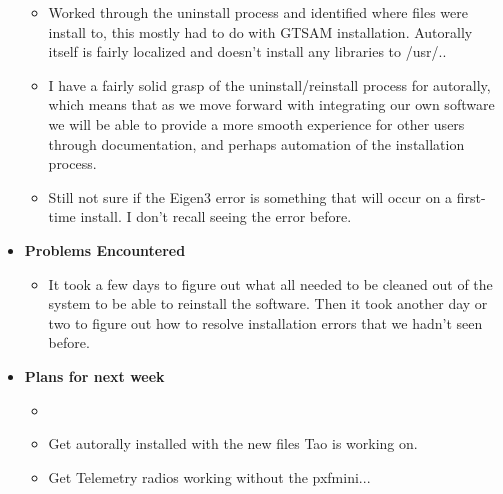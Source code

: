 \documentclass[compsoc,draftclsnofoot,onecolumn,10pt]{IEEEtran}
\begin{document}
\begin{itemize}
\begin{itemize}
    \item Worked through the uninstall process and identified where files were install to, this mostly had to do with GTSAM installation. Autorally itself is fairly localized and doesn't install any libraries to /usr/..
    
    \item I have a fairly solid grasp of the uninstall/reinstall process for autorally, which means that as we move forward with integrating our own software we will be able to provide a more smooth experience for other users through documentation, and perhaps automation of the installation process.
    
    \item Still not sure if the Eigen3 error is something that will occur on a first-time install. I don't recall seeing the error before.
        
    \end{itemize}

    \item {\textbf{Problems Encountered}}
    \begin{itemize}
        \item It took a few days to figure out what all needed to be cleaned out of the system to be able to reinstall the software. Then it took another day or two to figure out how to resolve installation errors that we hadn't seen before.
    \end{itemize}

    \item{\textbf{Plans for next week}}
    \begin{itemize}
        \item         \item Get autorally installed with the new files Tao is working on.
        \item Get Telemetry radios working without the pxfmini...
    \end{itemize}
\end{itemize}
\end{document}
